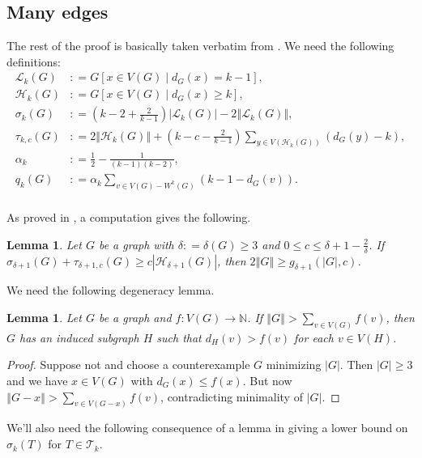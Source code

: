 \documentclass[12pt]{article}
\theoremstyle{plain}
\newtheorem{lem}[thm]{Lemma}
\theoremstyle{definition}
\theoremstyle{remark}
\newcommand{\fancy}[1]{\mathcal{#1}}
\newcommand{\IN}{\mathbb{N}}
\newcommand{\T}{\fancy{T}}
\renewcommand{\L}{\fancy{L}}
\newcommand{\HH}{\fancy{H}}
\newcommand{\card}[1]{\left|#1\right|}
\newcommand{\size}[1]{\left\Vert#1\right\Vert}
\newcommand{\func}[3]{#1\colon #2 \rightarrow #3}
\newcommand{\parens}[1]{\left( #1 \right)}
\newcommand{\brackets}[1]{\left[ #1 \right]}
\newcommand{\DefinedAs}{\mathrel{\mathop:}=}
\begin{document}
\subsection{Many edges}\label{LowerBoundSectionEuler}
The rest of the proof is basically taken verbatim from \cite{kostochkastiebitzedgesincriticalgraph}. We need the following definitions:
\begin{align*}
\L_k(G) &\DefinedAs G\brackets{x \in V(G) \mid d_G(x) = k-1},\\
\HH_k(G) &\DefinedAs G\brackets{x \in V(G) \mid d_G(x) \geq k},\\
\sigma_k(G) &\DefinedAs \parens{k-2 + \frac{2}{k-1}}\card{\L_k(G)} - 2\size{\L_k(G)},\\
\tau_{k,c}(G) &\DefinedAs 2\size{\HH_k(G)} + \parens{k-c - \frac{2}{k-1}}\sum_{y \in V(\HH_k(G))} \parens{d_G(y) - k},\\
\alpha_k &\DefinedAs \frac12 - \frac{1}{(k-1)(k-2)},\\
q_k(G) &\DefinedAs \alpha_k\sum_{v \in V(G) - W^k(G)} \parens{k-1 - d_G(v)}.\\
\end{align*}

\noindent As proved in \cite{kostochkastiebitzedgesincriticalgraph}, a computation gives the following.
\begin{lem}\label{SigmaTauBoundEuler}
Let $G$ be a graph with $\delta \DefinedAs \delta(G) \geq 3$ and $0 \leq c \leq \delta + 1 - \frac{2}{\delta}$.  If $\sigma_{\delta + 1}(G) + \tau_{\delta + 1, c}(G) \geq c\card{\HH_{\delta + 1}(G)}$, then $2\size{G} \geq g_{\delta + 1}(\card{G}, c)$.
\end{lem}

\noindent We need the following degeneracy lemma.
\begin{lem}\label{DegenerateEuler}
Let $G$ be a graph and $\func{f}{V(G)}{\IN}$.  If $\size{G} > \sum_{v \in V(G)} f(v)$, then $G$ has an induced subgraph $H$ such that $d_H(v) > f(v)$ for each $v \in V(H)$.
\end{lem}
\begin{proof}
Suppose not and choose a counterexample $G$ minimizing $\card{G}$. Then $\card{G} \geq 3$ and we have $x \in V(G)$ with $d_G(x) \leq f(x)$. But now $\size{G-x} > \sum_{v \in V(G-x)} f(v)$, contradicting minimality of $\card{G}$.
\end{proof}

We'll also need the following consequence of a lemma in \cite{kostochkastiebitzedgesincriticalgraph} giving a lower bound on $\sigma_k(T)$ for $T \in \T_k$.
\end{document}
